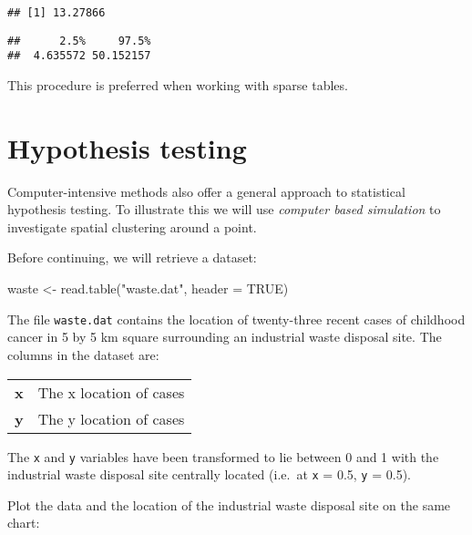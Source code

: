 \documentclass[
  12pt,
  a4paper]{book}
\newenvironment{Shaded}{\begin{snugshade}}{\end{snugshade}}
\newcommand{\AttributeTok}[1]{\textcolor[rgb]{0.77,0.63,0.00}{#1}}
\newcommand{\ConstantTok}[1]{\textcolor[rgb]{0.00,0.00,0.00}{#1}}
\newcommand{\FunctionTok}[1]{\textcolor[rgb]{0.00,0.00,0.00}{#1}}
\newcommand{\NormalTok}[1]{#1}
\newcommand{\OtherTok}[1]{\textcolor[rgb]{0.56,0.35,0.01}{#1}}
\newcommand{\StringTok}[1]{\textcolor[rgb]{0.31,0.60,0.02}{#1}}
\begin{document}
\begin{verbatim}
## [1] 13.27866
\end{verbatim}

\begin{verbatim}
##      2.5%     97.5% 
##  4.635572 50.152157
\end{verbatim}

This procedure is preferred when working with sparse tables.

\hypertarget{hypothesis-testing}{%
\section{Hypothesis testing}\label{hypothesis-testing}}

Computer-intensive methods also offer a general approach to statistical hypothesis testing. To illustrate this we will use \emph{computer based simulation} to investigate spatial clustering around a point.

Before continuing, we will retrieve a dataset:

\begin{Shaded}
\begin{Highlighting}[]
\NormalTok{waste }\OtherTok{\textless{}{-}} \FunctionTok{read.table}\NormalTok{(}\StringTok{"waste.dat"}\NormalTok{, }\AttributeTok{header =} \ConstantTok{TRUE}\NormalTok{)}
\end{Highlighting}
\end{Shaded}

The file \texttt{waste.dat} contains the location of twenty-three recent cases of childhood cancer in 5 by 5 km square surrounding an industrial waste disposal site. The columns in the dataset are:

\begin{longtable}[]{@{}
  >{\raggedright\arraybackslash}p{}
  >{\raggedright\arraybackslash}p{}@{}}
\toprule
\endhead
\textbf{x} & The x location of cases \\
\textbf{y} & The y location of cases \\
\bottomrule
\end{longtable}

The \texttt{x} and \texttt{y} variables have been transformed to lie between 0 and 1 with the industrial waste disposal site centrally located (i.e.~at \texttt{x} = 0.5, \texttt{y} = 0.5).

Plot the data and the location of the industrial waste disposal site on the same chart:
\end{document}
